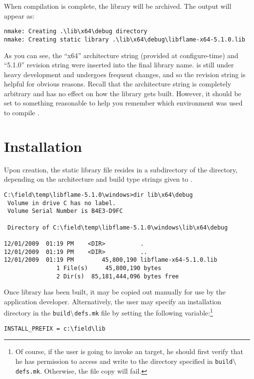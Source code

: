 \noindent
When compilation is complete, the library will be archived.
The output will appear as:

\begin{Verbatim}[frame=single,framesep=2.5mm,xleftmargin=5mm,fontsize=\footnotesize]
nmake: Creating .\lib\x64\debug directory
nmake: Creating static library .\lib\x64\debug\libflame-x64-5.1.0.lib
\end{Verbatim}

\noindent
As you can see, the ``x64'' architecture string (provided at configure-time)
and ``5.1.0'' revision string were inserted into the final library name.
\libflame is still under heavy development and undergoes frequent changes, and
so the revision string is helpful for obvious reasons.
Recall that the architecture string is completely arbitrary and has no effect
on how the library gets built.
However, it should be set to something reasonable to help you remember which
environment was used to compile \libflamens.


\section{Installation}


Upon creation, the static library file resides in a subdirectory of the \lib
directory, depending on the architecture and build type strings given to
\configurecmdns.

\begin{Verbatim}[frame=single,framesep=2.5mm,xleftmargin=5mm,fontsize=\footnotesize]
C:\field\temp\libflame-5.1.0\windows>dir lib\x64\debug
 Volume in drive C has no label.
 Volume Serial Number is B4E3-D9FC

 Directory of C:\field\temp\libflame-5.1.0\windows\lib\x64\debug

12/01/2009  01:19 PM    <DIR>          .
12/01/2009  01:19 PM    <DIR>          ..
12/01/2009  01:19 PM        45,800,190 libflame-x64-5.1.0.lib
               1 File(s)     45,800,190 bytes
               2 Dir(s)  85,181,444,096 bytes free
\end{Verbatim}

Once library has been built, it may be copied out manually for use by the
application developer.
Alternatively, the user may specify an installation directory in the
{\tt build$\backslash$defs.mk} file by setting the following variable:\footnote{
Of course, if the user is going to invoke an \install target, he should first
verify that he has permission to access and write to the directory specified
in {\tt build$\backslash$defs.mk}.
Otherwise, the file copy will fail.
}
\begin{Verbatim}[frame=single,framesep=2.5mm,xleftmargin=5mm,fontsize=\footnotesize]
INSTALL_PREFIX = c:\field\lib
\end{Verbatim}

